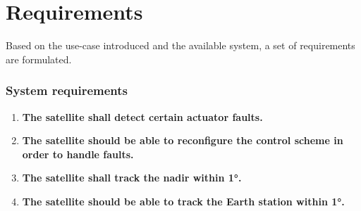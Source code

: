 \chapter{Requirements}\label{chap:requirements}
Based on the use-case introduced and the available system, a set of requirements are formulated.
%
\subsection*{System requirements}
%
\begin{enumerate}
	\item \textbf{The satellite shall detect certain actuator faults.}
	
	\item \textbf{The satellite should be able to reconfigure the control scheme in order to handle faults.}	
	
	\item \textbf{The satellite shall track the nadir within 1°.}	
	
	\item \textbf{The satellite should be able to track the Earth station within 1°.}		
	
\end{enumerate}


